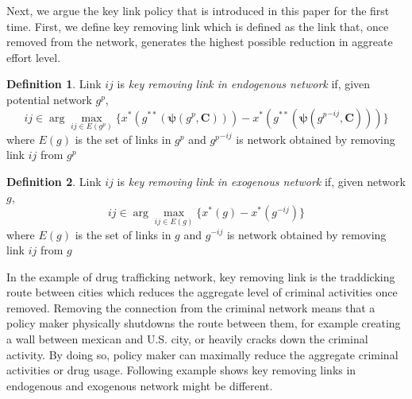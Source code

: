 \documentclass[12pt]{article}
\theoremstyle{definition}
\newtheorem{definition}{Definition}
\newcommand{\bm}[1]{\boldsymbol{#1}}
\begin{document}
Next, we argue the key link policy that is introduced in this paper for the first time.
First, we define key removing link which is defined as the link that, once removed from the network, generates the highest possible reduction in aggreate effort level.

\begin{definition}
	Link $ij$ is {\it{key removing link in endogenous network}} if, given potential network $g^p$,
    \[ ij \in \arg \max_{ij \in E(g^p)} \{ x^*(g^{**}(\bm{\psi}(g^p, \bm{C}))) - x^*(g^{**}(\bm{\psi}({g^p}^{-ij}, \bm{C}))) \} \]
    where $E(g)$ is the set of links in $g^p$ and ${g^p}^{-ij}$ is network obtained by removing link $ij$ from $g^p$
\end{definition}

\begin{definition}
	Link $ij$ is {\it{key removing link in exogenous network}} if, given network $g$,
    \[ ij \in \arg \max_{ij \in E(g)} \{ x^*(g) - x^*(g^{-ij}) \} \]
    where $E(g)$ is the set of links in $g$ and $g^{-ij}$ is network obtained by removing link $ij$ from $g$
\end{definition}

In the example of drug trafficking network, key removing link is the traddicking route between cities which reduces the aggregate level of criminal activities once removed.
Removing the connection from the criminal network means that a policy maker physically shutdowns the route between them, for example creating a wall between mexican and U.S. city, or heavily cracks down the criminal activity.
By doing so, policy maker can maximally reduce the aggregate criminal activities or drug usage.
Following example shows key removing links in endogenous and exogenous network might be different.
\end{document}
